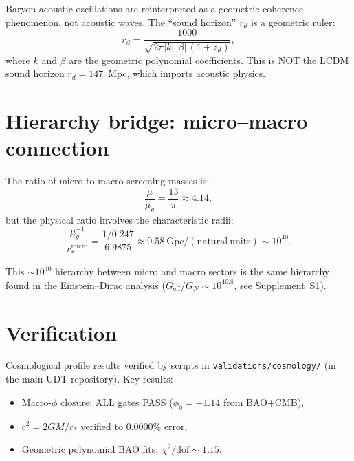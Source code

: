\documentclass[11pt,letterpaper]{article}
\numberwithin{equation}{section}
\begin{document}
Baryon acoustic oscillations are reinterpreted as a geometric coherence
phenomenon, not acoustic waves. The ``sound horizon'' $r_d$ is a geometric
ruler:
\begin{equation}
  r_d = \frac{1000}{\sqrt{2\pi|k|\,|\beta|\,(1+z_d)}},
\end{equation}
where $k$ and $\beta$ are the geometric polynomial coefficients.
This is NOT the LCDM sound horizon $r_d = 147$~Mpc, which imports
acoustic physics.

\section{Hierarchy bridge: micro--macro connection}
\label{sec:hierarchy}

The ratio of micro to macro screening masses is:
\begin{equation}
  \frac{\mu}{\mu_g} = \frac{13}{\pi} \approx 4.14,
\end{equation}
but the physical ratio involves the characteristic radii:
\begin{equation}
  \frac{\mu_g^{-1}}{r_*^\mathrm{micro}} = \frac{1/0.247}{6.9875}
  \approx 0.58~\mathrm{Gpc}/\mathrm{(natural~units)} \sim 10^{40}.
\end{equation}

This $\sim 10^{40}$ hierarchy between micro and macro sectors is the same
hierarchy found in the Einstein--Dirac analysis ($G_\mathrm{eff}/G_N \sim 10^{40.8}$,
see Supplement~S1).

\section{Verification}
\label{sec:verification}

Cosmological profile results verified by scripts in
\texttt{validations/cosmology/} (in the main UDT repository). Key results:
\begin{itemize}
  \item Macro-$\phi$ closure: ALL gates PASS ($\phi_0 = -1.14$ from BAO+CMB),
  \item $c^2 = 2GM/r_*$ verified to $0.0000\%$ error,
  \item Geometric polynomial BAO fits: $\chi^2/\mathrm{dof} \sim 1.15$.
\end{itemize}
\end{document}
